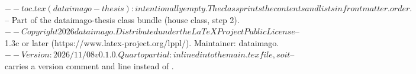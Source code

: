 $-- toc.tex (dataimago-thesis): intentionally empty. The class prints the contents and lists in frontmatter.order.
$-- Part of the dataimago-thesis class bundle (house class, step 2).
$-- Copyright 2026 dataimago. Distributed under the LaTeX Project Public License
$-- 1.3c or later (https://www.latex-project.org/lppl/). Maintainer: dataimago.
$-- Version: 2026/11/08 v0.1.0. Quarto partial: inlined into the main .tex file, so it
$-- carries a version comment and \typeout line instead of \ProvidesFile.
